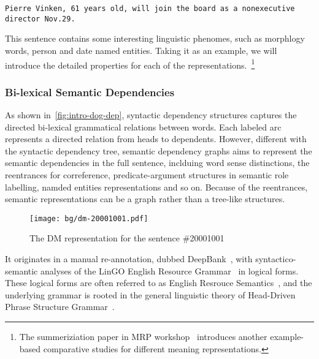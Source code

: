 \texttt{Pierre Vinken, 61 years old, will join the board as a nonexecutive director Nov.29.}

This sentence contains some interesting linguistic phenomes, such as
morphlogy words, person and date named entities. Taking it as an
example, we will introduce the detailed properties for each of the
representations.~\footnote{The summeriziation paper in MRP
  workshop~\citep{Mar:San:Mar:93} introduces another example-based
  comparative studies for different meaning representations.}

\subsubsection{Bi-lexical Semantic Dependencies}
\label{ssec:bg:bi-leixcal}

As shown in~\autoref{fig:intro-dog-dep}, syntactic dependency
structures captures the directed bi-lexical grammatical relations
between words. Each labeled arc represents a directed relation from
heads to dependents. However, different with the syntactic dependency
tree, semantic dependency graphs aims to represent the semantic
dependencies in the full sentence, inclduing word sense distinctions,
the reentrances for correference, predicate-argument structures in
semantic role labelling, namded entities representations and so
on. Because of the reentrances, semantic representations can be a
graph rather than a tree-like structures.
\begin{figure}[!th]
\centering
\texttt{[image: bg/dm-20001001.pdf]}
\caption{\label{fig:bg-dm}The DM representation for the sentence
  \#20001001}
\end{figure}

 It
originates in a manual re-annotation, dubbed
DeepBank~\citep{Fli:Kor:Zha:12}, with syntactico-semantic analyses of
the LinGO English Resource Grammar~\citep{Oep:Fli:Tou:04} in logical
forms. These logical forms are often referred to as English Resrouce
Semantics~\citep[ERS,][]{Ben:Fli:Oep:15}, and the underlying grammar
is rooted in the general linguistic theory of Head-Driven Phrase
Structure Grammar~\citep[HPSG,][]{Pol:Sag:94}.

